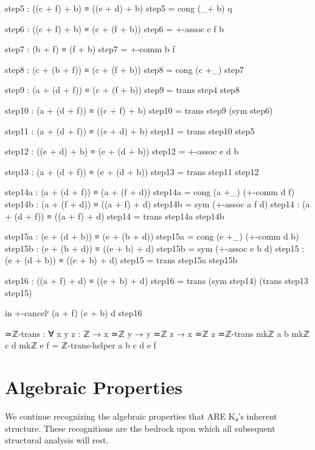 \documentclass[11pt,a4paper]{book}
\begin{document}
\begin{code}
    step5 : ((c + f) + b) ≡ ((e + d) + b)
    step5 = cong (_+ b) q
    
    step6 : ((c + f) + b) ≡ (c + (f + b))
    step6 = +-assoc c f b
    
    step7 : (b + f) ≡ (f + b)
    step7 = +-comm b f
    
    step8 : (c + (b + f)) ≡ (c + (f + b))
    step8 = cong (c +_) step7
    
    step9 : (a + (d + f)) ≡ (c + (f + b))
    step9 = trans step4 step8
    
    step10 : (a + (d + f)) ≡ ((c + f) + b)
    step10 = trans step9 (sym step6)
    
    step11 : (a + (d + f)) ≡ ((e + d) + b)
    step11 = trans step10 step5
    
    step12 : ((e + d) + b) ≡ (e + (d + b))
    step12 = +-assoc e d b
    
    step13 : (a + (d + f)) ≡ (e + (d + b))
    step13 = trans step11 step12
    
\end{code}

\begin{code}
    step14a : (a + (d + f)) ≡ (a + (f + d))
    step14a = cong (a +_) (+-comm d f)
    step14b : (a + (f + d)) ≡ ((a + f) + d)
    step14b = sym (+-assoc a f d)
    step14 : (a + (d + f)) ≡ ((a + f) + d)
    step14 = trans step14a step14b
    
    step15a : (e + (d + b)) ≡ (e + (b + d))
    step15a = cong (e +_) (+-comm d b)
    step15b : (e + (b + d)) ≡ ((e + b) + d)
    step15b = sym (+-assoc e b d)
    step15 : (e + (d + b)) ≡ ((e + b) + d)
    step15 = trans step15a step15b
    
    step16 : ((a + f) + d) ≡ ((e + b) + d)
    step16 = trans (sym step14) (trans step13 step15)
    
  in +-cancelʳ (a + f) (e + b) d step16

≃ℤ-trans : ∀ {x y z : ℤ} → x ≃ℤ y → y ≃ℤ z → x ≃ℤ z
≃ℤ-trans {mkℤ a b} {mkℤ c d} {mkℤ e f} = ℤ-trans-helper a b c d e f
\end{code}

\section{Algebraic Properties}

We continue recognizing the algebraic properties that ARE K₄'s inherent structure. These recognitions are the bedrock upon which all subsequent structural analysis will rest.
\end{document}
